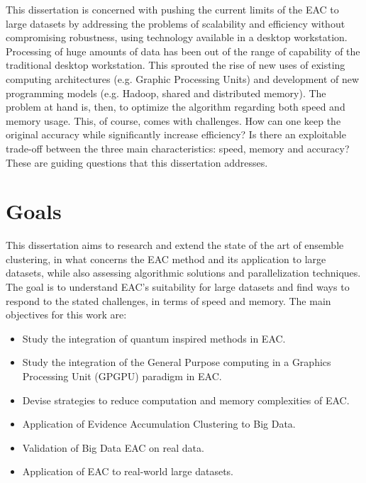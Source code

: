 This dissertation is concerned with pushing the current limits of the EAC to large datasets by addressing the problems of scalability and efficiency without compromising robustness, using technology available in a desktop workstation.
Processing of huge amounts of data has been out of the range of capability of the traditional desktop workstation.
This sprouted the rise of new uses of existing computing architectures (e.g. Graphic Processing Units) and development of new programming models (e.g. Hadoop, shared and distributed memory).
The problem at hand is, then, to  optimize the algorithm regarding both speed and memory usage.
This, of course, comes with challenges.
How can one keep the original accuracy while significantly increase efficiency?
Is there an exploitable trade-off between the three main characteristics: speed, memory and accuracy?
These are guiding questions that this dissertation addresses.


\section{Goals}

This dissertation aims to research and extend the state of the art of ensemble clustering, in what concerns the EAC method and its application to large datasets, while also assessing algorithmic solutions and parallelization techniques.
The goal is to understand EAC's suitability for large datasets and find ways to respond to the stated challenges, in terms of speed and memory.
The main objectives for this work are:

\begin{itemize}

\item Study the integration of quantum inspired methods in EAC.

\item Study the integration of the General Purpose computing in a Graphics Processing Unit (GPGPU) paradigm in EAC.

\item Devise strategies to reduce computation and memory complexities of EAC.

\item Application of Evidence Accumulation Clustering to Big Data.

\item Validation of Big Data EAC on real data.%
\item Application of EAC to real-world large datasets.
\end{itemize}

